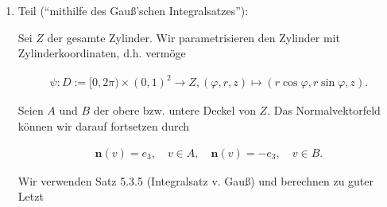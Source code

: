 \begin{solution}
\begin{enumerate}
    \item Teil (\enquote{mithilfe des Gauß'schen Integralsatzes}):
    
    Sei $Z$ der gesamte Zylinder.
    Wir parametrisieren den Zylinder mit Zylinderkoordinaten, d.h. vermöge

    \begin{align*}
        \psi:
            D := [0, 2 \pi) \times (0, 1)^2 \to Z,
            (\varphi, r, z) \mapsto (r \cos \varphi, r \sin \varphi, z).
    \end{align*}

    Seien $A$ und $B$ der obere bzw. untere Deckel von $Z$.
    Das Normalvektorfeld können wir darauf fortsetzen durch

    \begin{align*}
        \mathbf n(v) =  e_3,
        \quad
        v \in A,
        \quad
        \mathbf n(v) = -e_3,
        \quad
        v \in B.
    \end{align*}


    Wir verwenden Satz 5.3.5 (Integralsatz v. Gauß) und berechnen zu guter Letzt


\end{enumerate}
\end{solution}
